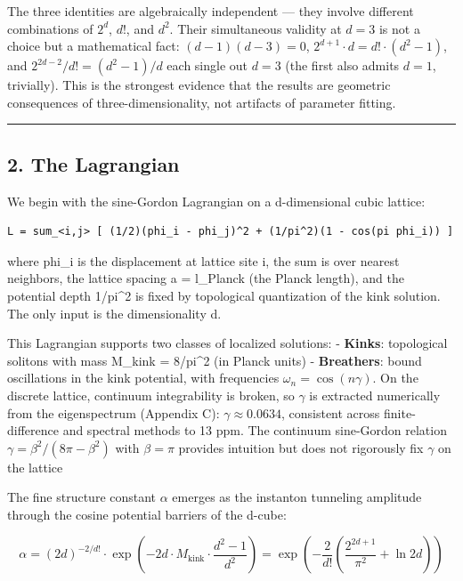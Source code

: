 \documentclass[
]{article}
\begin{document}
The three identities are algebraically independent --- they involve
different combinations of \(2^d\), \(d!\), and \(d^2\). Their
simultaneous validity at \(d=3\) is not a choice but a mathematical
fact: \((d-1)(d-3) = 0\), \(2^{d+1} \cdot d = d! \cdot (d^2-1)\), and
\(2^{2d-2}/d! = (d^2-1)/d\) each single out \(d=3\) (the first also
admits \(d=1\), trivially). This is the strongest evidence that the
results are geometric consequences of three-dimensionality, not
artifacts of parameter fitting.

\begin{center}\rule{0.5\linewidth}{0.5pt}\end{center}

\subsection{2. The Lagrangian}\label{the-lagrangian}

We begin with the sine-Gordon Lagrangian on a d-dimensional cubic
lattice:

\begin{verbatim}
L = sum_<i,j> [ (1/2)(phi_i - phi_j)^2 + (1/pi^2)(1 - cos(pi phi_i)) ]
\end{verbatim}

where phi\_i is the displacement at lattice site i, the sum is over
nearest neighbors, the lattice spacing a = l\_Planck (the Planck
length), and the potential depth 1/pi\^{}2 is fixed by topological
quantization of the kink solution. The only input is the dimensionality
d.

This Lagrangian supports two classes of localized solutions: -
\textbf{Kinks}: topological solitons with mass M\_kink = 8/pi\^{}2 (in
Planck units) - \textbf{Breathers}: bound oscillations in the kink
potential, with frequencies \(\omega_n = \cos(n\gamma)\). On the
discrete lattice, continuum integrability is broken, so \(\gamma\) is
extracted numerically from the eigenspectrum (Appendix C):
\(\gamma \approx 0.0634\), consistent across finite-difference and
spectral methods to 13 ppm. The continuum sine-Gordon relation
\(\gamma = \beta^2/(8\pi - \beta^2)\) with \(\beta = \pi\) provides
intuition but does not rigorously fix \(\gamma\) on the lattice

The fine structure constant \(\alpha\) emerges as the instanton
tunneling amplitude through the cosine potential barriers of the d-cube:

\[\alpha = (2d)^{-2/d!} \cdot \exp\!\left(-2d \cdot M_{\text{kink}} \cdot \frac{d^2-1}{d^2}\right) = \exp\!\left(-\frac{2}{d!}\left(\frac{2^{2d+1}}{\pi^2} + \ln 2d\right)\right)\]
\end{document}
